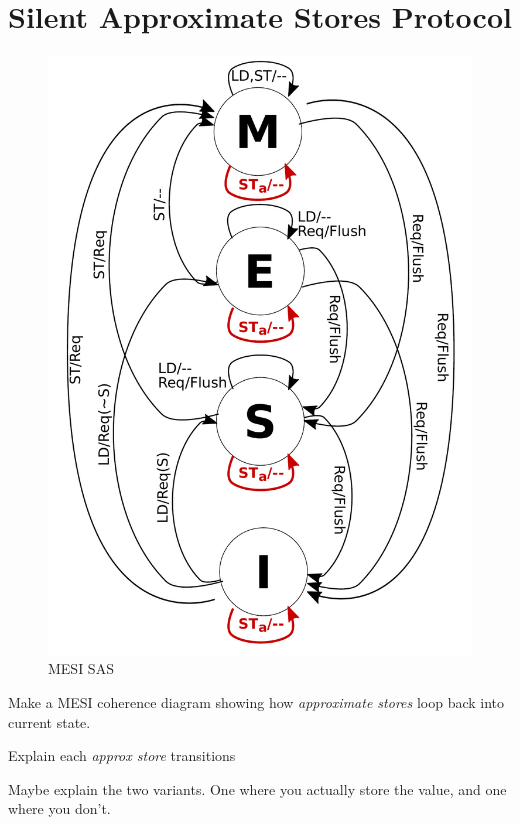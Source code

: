 \section{Silent Approximate Stores Protocol}

\begin{figure}[htbp]
	\centerline{\includegraphics[scale=0.4]{figures/MESI_SAS.pdf}}
	\caption{MESI SAS}
\label{fig:mesi_sas}
\end{figure}

Make a MESI coherence diagram showing how \textit{approximate stores} loop back into current state.

Explain each \textit{approx store} transitions

Maybe explain the two variants. One where you actually store the value, and one where you don't.